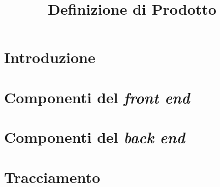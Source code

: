 

\usepackage{placeins}

\author{\ALL}
\supervisor{\AZ, \PB}
\dest{\ALL}
\title{Definizione di Prodotto}

\newcommand{\nogloxy}[1]{#1}
\newcommand{\subsubsubsection}[1]{\paragraph{#1}}
\newcommand{\textt}[1]{\texttt{#1}}


\maketitle

\tableofcontents



\section{Introduzione}


\section{Componenti del \emph{front end}} \label{sec:front}


\section{Componenti del \emph{back end}} \label{sec:back}


\section{Tracciamento} \label{sec:tracc}



